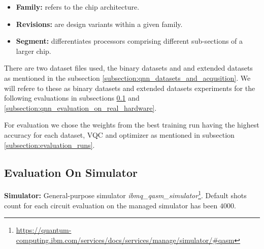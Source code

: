 \begin{itemize}
    \item \textbf{Family:} refers to the chip architecture. 
    \item \textbf{Revisions:} are design variants within a given family. 
    \item \textbf{Segment:} differentiates processors comprising different sub-sections of a larger chip.
\end{itemize}

There are two dataset files used, the binary datasets and and extended datasets as mentioned in the subsection \ref{subsection:qnn_datasets_and_acqusition}. We will refere to these as binary datasets and extended datasets experiments for the following evaluations in subsections \ref{subsection:qnn_evaluation_on_simulator} and \ref{subsection:qnn_evaluation_on_real_hardware}.

For evaluation we chose the weights from the best training run having the highest accuracy for each dataset, VQC and optimizer as mentioned in subsection \ref{subsection:evaluation_runs}.
 
\clearpage
\subsection{Evaluation On Simulator}
\label{subsection:qnn_evaluation_on_simulator}
\textbf{Simulator:} General-purpose simulator \textit{ibmq\_qasm\_simulator}\footnote{\url{https://quantum-computing.ibm.com/services/docs/services/manage/simulator/#qasm}}. Default shots count for each circuit evaluation on the managed simulator has been $4000$.

